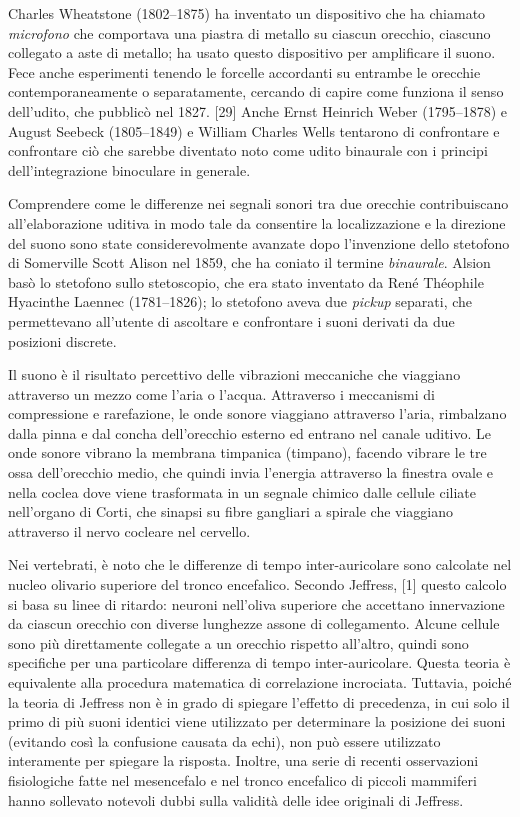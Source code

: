 Charles Wheatstone (1802–1875) ha inventato un dispositivo che ha chiamato
\emph{microfono} che comportava una piastra di metallo su ciascun orecchio,
ciascuno collegato a aste di metallo; ha usato questo dispositivo per amplificare
il suono. Fece anche esperimenti tenendo le forcelle accordanti su entrambe le
orecchie contemporaneamente o separatamente, cercando di capire come funziona
il senso dell'udito, che pubblicò nel 1827. [29] Anche Ernst Heinrich Weber
(1795–1878) e August Seebeck (1805–1849) e William Charles Wells tentarono di
confrontare e confrontare ciò che sarebbe diventato noto come udito binaurale
con i principi dell'integrazione binoculare in generale.

Comprendere come le differenze nei segnali sonori tra due orecchie contribuiscano
all'elaborazione uditiva in modo tale da consentire la localizzazione e la
direzione del suono sono state considerevolmente avanzate dopo l'invenzione
dello stetofono di Somerville Scott Alison nel 1859, che ha coniato il termine
\emph{binaurale}. Alsion basò lo stetofono sullo stetoscopio, che era stato
inventato da René Théophile Hyacinthe Laennec (1781–1826); lo stetofono aveva
due \emph{pickup} separati, che permettevano all'utente di ascoltare e
confrontare i suoni derivati ​​da due posizioni discrete.

Il suono è il risultato percettivo delle vibrazioni meccaniche che viaggiano
attraverso un mezzo come l'aria o l'acqua. Attraverso i meccanismi di
compressione e rarefazione, le onde sonore viaggiano attraverso l'aria,
rimbalzano dalla pinna e dal concha dell'orecchio esterno ed entrano nel canale
uditivo. Le onde sonore vibrano la membrana timpanica (timpano), facendo vibrare
le tre ossa dell'orecchio medio, che quindi invia l'energia attraverso la
finestra ovale e nella coclea dove viene trasformata in un segnale chimico
dalle cellule ciliate nell'organo di Corti, che sinapsi su fibre gangliari a
spirale che viaggiano attraverso il nervo cocleare nel cervello.

Nei vertebrati, è noto che le differenze di tempo inter-auricolare sono
calcolate nel nucleo olivario superiore del tronco encefalico. Secondo Jeffress,
[1] questo calcolo si basa su linee di ritardo: neuroni nell'oliva superiore che
accettano innervazione da ciascun orecchio con diverse lunghezze assone di
collegamento. Alcune cellule sono più direttamente collegate a un orecchio
rispetto all'altro, quindi sono specifiche per una particolare differenza di
tempo inter-auricolare. Questa teoria è equivalente alla procedura matematica
di correlazione incrociata. Tuttavia, poiché la teoria di Jeffress non è in
grado di spiegare l'effetto di precedenza, in cui solo il primo di più suoni
identici viene utilizzato per determinare la posizione dei suoni (evitando così
la confusione causata da echi), non può essere utilizzato interamente per spiegare
la risposta. Inoltre, una serie di recenti osservazioni fisiologiche fatte nel
mesencefalo e nel tronco encefalico di piccoli mammiferi hanno sollevato notevoli
dubbi sulla validità delle idee originali di Jeffress.

